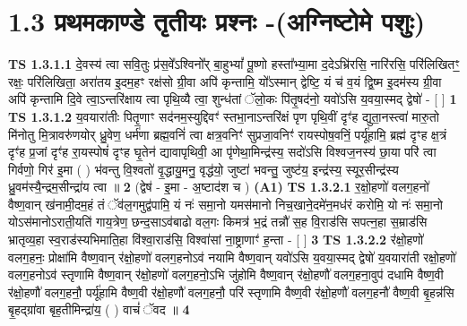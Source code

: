 \documentclass[17pt]{extarticle}
\begin{document}
     \section*{ 1.3     प्रथमकाण्डे तृतीयः प्रश्नः -(अग्निष्टोमे पशुः) }
                                        \textbf{ TS 1.3.1.1} \newline
                  दे॒वस्य॑ त्वा सवि॒तुः प्र॑स॒वे᳚ऽश्विनो᳚र् बा॒हुभ्यां᳚ पू॒ष्णो हस्ता᳚भ्या॒मा द॒देऽभ्रि॑रसि॒ नारि॑रसि॒ परि॑लिखितꣳ॒॒ रक्षः॒ परि॑लिखिता॒ अरा॑तय इ॒दम॒हꣳ रक्ष॑सो ग्री॒वा अपि॑ कृन्तामि॒ यो᳚ऽस्मान् द्वेष्टि॒ यं च॑ व॒यं द्वि॒ष्म इ॒दम॑स्य ग्री॒वा अपि॑ कृन्तामि दि॒वे त्वा॒ऽन्तरि॑क्षाय त्वा पृथि॒व्यै त्वा॒ शुन्ध॑तां ॅलो॒कः पि॑तृ॒षद॑नो॒ यवो॑ऽसि य॒वया॒स्मद् द्वेषो॑ - [ ] \textbf{  1} \newline
                  \newline
                                \textbf{ TS 1.3.1.2} \newline
                  य॒वयारा॑तीः पितृ॒णाꣳ सद॑नम॒स्युद्दिवꣳ॑ स्तभा॒नाऽन्तरि॑क्षं पृण पृथि॒वीं दृꣳ॑ह द्युता॒नस्त्वा॑ मारु॒तो मि॑नोतु मि॒त्रावरु॑णयोर् ध्रु॒वेण॒ धर्म॑णा ब्रह्म॒वनिं॑ त्वा क्षत्र॒वनिꣳ॑ सुप्रजा॒वनिꣳ॑ रायस्पोष॒वनिं॒ पर्यू॑हामि॒ ब्रह्म॑ दृꣳह क्ष॒त्रं दृꣳ॑ह प्र॒जां दृꣳ॑ह रा॒यस्पोषं॑ दृꣳह घृ॒तेन॑ द्यावापृथिवी॒ आ पृ॑णेथा॒मिन्द्र॑स्य॒ सदो॑ऽसि विश्वज॒नस्य॑ छा॒या परि॑ त्वा गिर्वणो॒ गिर॑ इ॒मा ( ) भ॑वन्तु वि॒श्वतो॑ वृ॒द्धायु॒मनु॒ वृद्ध॑यो॒ जुष्टा॑ भवन्तु॒ जुष्ट॑य॒ इन्द्र॑स्य॒ स्यूर॒सीन्द्र॑स्य ध्रु॒वम॑स्यै॒न्द्रम॒सीन्द्रा॑य त्वा ॥ \textbf{  2 } \newline
                  \newline
                      (द्वेष॑ - इ॒मा - अ॒ष्टाद॑श च )  \textbf{(A1)} \newline \newline
                                        \textbf{ TS 1.3.2.1} \newline
                  र॒क्षो॒हणो॑ वलग॒हनो॑ वैष्ण॒वान् ख॑नामी॒दम॒हं तं ॅव॑ल॒गमुद्व॑पामि॒ यं नः॑ समा॒नो यमस॑मानो निच॒खाने॒दमे॑न॒मध॑रं करोमि॒ यो नः॑ समा॒नो योऽस॑मानोऽराती॒यति॑ गाय॒त्रेण॒ छन्द॒साऽव॑बाढो वल॒गः किमत्र॑ भ॒द्रं तन्नौ॑ स॒ह वि॒राड॑सि सपत्न॒हा स॒म्राड॑सि भ्रातृव्य॒हा स्व॒राड॑स्यभिमाति॒हा वि॑श्वा॒राड॑सि॒ विश्वा॑सां ना॒ष्ट्राणाꣳ॑ ह॒न्ता - [ ] \textbf{  3 } \newline
                  \newline
                                \textbf{ TS 1.3.2.2} \newline
                  र॑क्षो॒हणो॑ वलग॒हनः॒ प्रोक्षा॑मि वैष्ण॒वान् र॑क्षो॒हणो॑ वलग॒हनोऽव॑ नयामि वैष्ण॒वान् यवो॑ऽसि य॒वया॒स्मद् द्वेषो॑ य॒वयारा॑ती रक्षो॒हणो॑ वलग॒हनोऽव॑ स्तृणामि वैष्ण॒वान् र॑क्षो॒हणो॑ वलग॒हनो॒ऽभि जु॑होमि वैष्ण॒वान् र॑क्षो॒हणौ॑ वलग॒हना॒वुप॑ दधामि वैष्ण॒वी र॑क्षो॒हणौ॑ वलग॒हनौ॒ पर्यू॑हामि वैष्ण॒वी र॑क्षो॒हणौ॑ वलग॒हनौ॒ परि॑ स्तृणामि वैष्ण॒वी र॑क्षो॒हणौ॑ वलग॒हनौ॑ वैष्ण॒वी बृ॒हन्न॑सि बृ॒हद्ग्रा॑वा बृह॒तीमिन्द्रा॑य॒ ( ) वाचं॑ ॅवद ॥ \textbf{  4 } \newline
\end{document}
